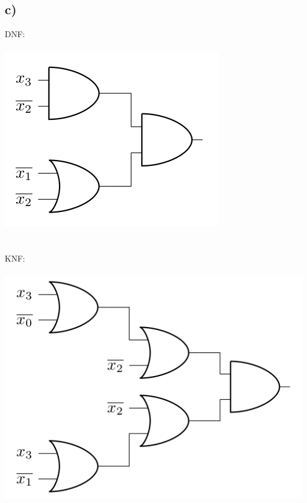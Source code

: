 \documentclass[a4paper]{scrartcl}
\begin{document}
	\subsection{c)}
	DNF:\\
	\\
	\includegraphics[scale=1]{dnf.png} \\
	\\
	\\
	KNF:\\
	\\
	\includegraphics[scale=1]{knf.png}\\
\end{document}
